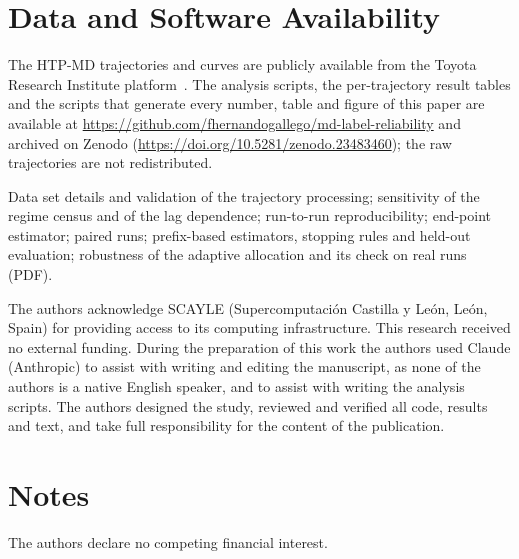 \documentclass[journal=jcisd8,manuscript=article,email=true]{achemso}
\begin{document}
\section*{Data and Software Availability}
The HTP-MD trajectories and curves are publicly available from the Toyota Research Institute
platform~\cite{Xie2023HTPMD}. The analysis scripts, the per-trajectory result tables and the
scripts that generate every number, table and figure of this paper are available at
\url{https://github.com/fhernandogallego/md-label-reliability} and archived on Zenodo
(\url{https://doi.org/10.5281/zenodo.23483460}); the raw trajectories are not redistributed.

\begin{suppinfo}
Data set details and validation of the trajectory processing; sensitivity of the regime census and
of the lag dependence; run-to-run reproducibility; end-point estimator; paired runs; prefix-based
estimators, stopping rules and held-out evaluation; robustness of the adaptive allocation and its check on real runs (PDF).
\end{suppinfo}

\begin{acknowledgement}
The authors acknowledge SCAYLE (Supercomputaci\'on Castilla y Le\'on, Le\'on, Spain) for
providing access to its computing infrastructure. This research received no external funding.
During the preparation of this work the authors used Claude (Anthropic) to assist with writing and
editing the manuscript, as none of the authors is a native English speaker, and to assist with
writing the analysis scripts. The authors designed the study, reviewed and verified all code,
results and text, and take full responsibility for the content of the publication.
\end{acknowledgement}

\section*{Notes}
The authors declare no competing financial interest.


\end{document}
